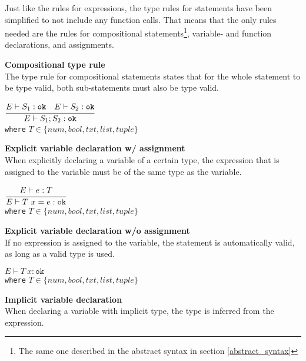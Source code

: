 Just like the rules for expressions, the type rules for statements have been simplified to not include any function calls.
That means that the only rules needed are the rules for compositional statements\footnote{The same one described in the abstract syntax in section \ref{abstract_syntax}}, variable- and function declarations, and assignments.

\textbf{Compositional type rule}\\
The type rule for compositional statements states that for the whole statement to be type valid, both sub-statements must also be type valid.

\begin{center}
	\begin{math}
	\cfrac
	{E \vdash S_1 : \texttt{ok}\quad E \vdash S_2 : \texttt{ok}}
	{E \vdash S_1;S_2 : \texttt{ok}}
	\end{math}
	\\[1\baselineskip]
	\texttt{where} $T \in \{num, bool, txt, list, tuple\}$
\end{center}


\textbf{Explicit variable declaration w/ assignment}\\
When explicitly declaring a variable of a certain type, the expression that is assigned to the variable must be of the same type as the variable.

\begin{center}
	\begin{math}
		\cfrac
		{E \vdash e : T}
		{E \vdash T\ x = e : \texttt{ok}}
	\end{math}
	\\[1\baselineskip]
	\texttt{where} $T \in \{num, bool, txt, list, tuple\}$
\end{center}

\textbf{Explicit variable declaration w/o assignment}\\
If no expression is assigned to the variable, the statement is automatically valid, as long as a valid type is used.

\begin{center}
	\begin{math}
		E \vdash T\ x : \texttt{ok}
	\end{math}
	\\[1\baselineskip]
	\texttt{where} $T \in \{num, bool, txt, list, tuple\}$
\end{center}

\textbf{Implicit variable declaration}\\
When declaring a variable with implicit type, the type is inferred from the expression.

